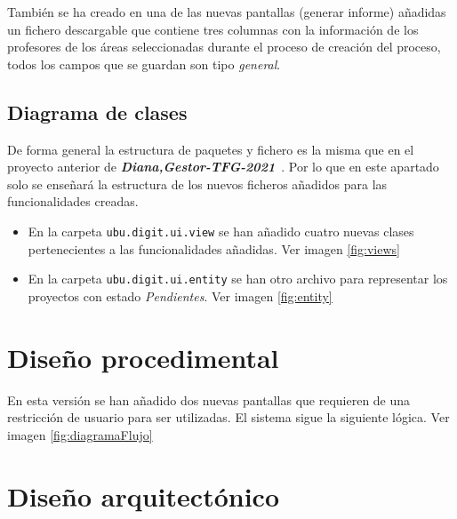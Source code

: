 También se ha creado en una de las nuevas pantallas (generar informe) añadidas un fichero descargable que contiene tres columnas con la información de los profesores de los áreas seleccionadas durante el proceso de creación del proceso, todos los campos que se guardan son tipo \emph{general}.

\subsection{Diagrama de clases}

De forma general la estructura de paquetes y fichero es la misma que en el proyecto anterior de \textbf{\textit{Diana,Gestor-TFG-2021}}~\cite{Gestor-TFG-2021}. Por lo que en este apartado solo se enseñará la estructura de los nuevos ficheros añadidos para las funcionalidades creadas.

\begin{itemize}
	\item En la carpeta \texttt{ubu.digit.ui.view} se han añadido cuatro nuevas clases pertenecientes a las funcionalidades añadidas. Ver imagen \ref{fig:views}
	
	
	\item En la carpeta \texttt{ubu.digit.ui.entity} se han otro archivo para representar los proyectos con estado \emph{Pendientes}. Ver imagen \ref{fig:entity}
	
	
\end{itemize}

\section{Diseño procedimental}
En esta versión se han añadido dos nuevas pantallas que requieren de una restricción de usuario para ser utilizadas.
El sistema sigue la siguiente lógica. Ver imagen \ref{fig:diagramaFlujo}


\section{Diseño arquitectónico}


